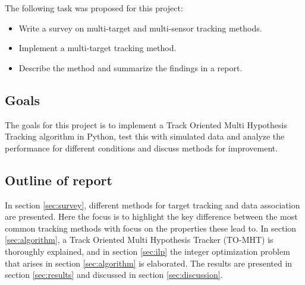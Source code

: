 The following task was proposed for this project:
\begin{itemize}
\item Write a survey on multi-target and multi-sensor tracking methods.
\item Implement a multi-target tracking method.
\item Describe the method and summarize the findings in a report.
\end{itemize}

\subsection{Goals}
The goals for this project is to implement a Track Oriented Multi Hypothesis Tracking algorithm in Python, test this with simulated data and analyze the performance for different conditions and discuss methods for improvement.

\subsection{Outline of report}
In section \ref{sec:survey}, different methods for target tracking and data association are presented. Here the focus is to highlight the key difference between the most common tracking methods with focus on the properties these lead to. In section \ref{sec:algorithm}, a Track Oriented Multi Hypothesis Tracker (TO-MHT) is thoroughly explained, and in section \ref{sec:ilp} the integer optimization problem that arises in section \ref{sec:algorithm} is elaborated. The results are presented in section \ref{sec:results} and discussed in section \ref{sec:discussion}.